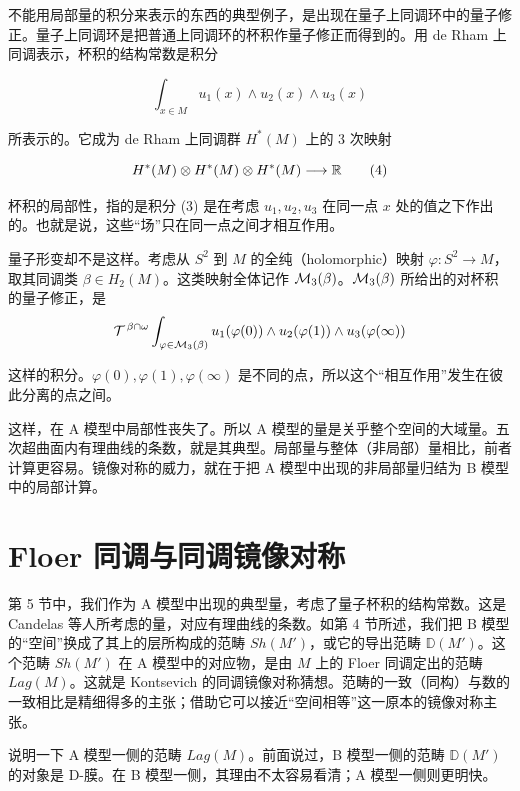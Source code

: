 不能用局部量的积分来表示的东西的典型例子，是出现在量子上同调环中的量子修正。量子上同调环是把普通上同调环的杯积作量子修正而得到的。用 de Rham 上同调表示，杯积的结构常数是积分

\[
  \int_{x\in M} u_1(x)\wedge u_2(x)\wedge u_3(x) \tag{3}
\]

所表示的。它成为 de Rham 上同调群 $H^*(M)$ 上的 3 次映射

\[
  H^*(M)\otimes H^*(M)\otimes H^*(M) \longrightarrow \mathbb{R} \tag{4}
\]

杯积的局部性，指的是积分 (3) 是在考虑 $u_1,u_2,u_3$ 在同一点 $x$ 处的值之下作出的。也就是说，这些“场”只在同一点之间才相互作用。

量子形变却不是这样。考虑从 $S^2$ 到 $M$ 的全纯（holomorphic）映射 $\varphi : S^2 \to M$，取其同调类 $\beta \in H_2(M)$。这类映射全体记作 $\mathcal{M}_3(\beta)$。$\mathcal{M}_3(\beta)$ 所给出的对杯积的量子修正，是
\[
  \mathcal{T}^{\,\beta\cap\omega}
  \int_{\varphi\in\mathcal{M}_3(\beta)}
  u_1(\varphi(0))\wedge u_2(\varphi(1))\wedge u_3(\varphi(\infty))
\]

这样的积分。$\varphi(0),\varphi(1),\varphi(\infty)$ 是不同的点，所以这个“相互作用”发生在彼此分离的点之间。


这样，在 A 模型中局部性丧失了。所以 A 模型的量是关乎整个空间的大域量。五次超曲面内有理曲线的条数，就是其典型。局部量与整体（非局部）量相比，前者计算更容易。镜像对称的威力，就在于把 A 模型中出现的非局部量归结为 B 模型中的局部计算。

\section{Floer 同调与同调镜像对称}

第 5 节中，我们作为 A 模型中出现的典型量，考虑了量子杯积的结构常数。这是 Candelas 等人所考虑的量，对应有理曲线的条数。如第 4 节所述，我们把 B 模型的“空间”换成了其上的层所构成的范畴 $Sh(M')$，或它的导出范畴 $\mathbb{D}(M')$。这个范畴 $Sh(M')$ 在 A 模型中的对应物，是由 $M$ 上的 Floer 同调定出的范畴 $Lag(M)$。这就是 Kontsevich 的同调镜像对称猜想。范畴的一致（同构）与数的一致相比是精细得多的主张；借助它可以接近“空间相等”这一原本的镜像对称主张。

说明一下 A 模型一侧的范畴 $Lag(M)$。前面说过，B 模型一侧的范畴 $\mathbb{D}(M')$ 的对象是 D-膜。在 B 模型一侧，其理由不太容易看清；A 模型一侧则更明快。

